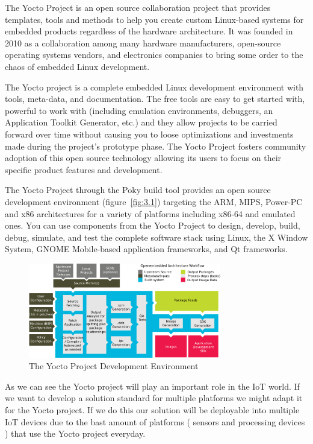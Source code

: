 The Yocto Project is an open source collaboration project that provides
templates, tools and methods to help you create custom Linux-based systems for
embedded products regardless of the hardware architecture\cite{yocto-project}.
It was founded in 2010 as a collaboration among many hardware manufacturers,
open-source operating systems vendors, and electronics companies to bring some
order to the chaos of embedded Linux development.\cite{Leppakoski}

The Yocto project  is a  complete embedded Linux development environment with
tools, meta-data, and documentation. The free tools are easy to get started
with, powerful to work with (including emulation environments, debuggers, an
Application Toolkit Generator, etc.) and they allow projects to be carried
forward over time without causing you to loose optimizations and investments
made during the project's prototype phase. The Yocto Project fosters community
adoption of this open source technology allowing its users to focus on their
specific product features and development.

The Yocto Project through the Poky build tool provides an open source
development environment (figure~\ref{fig:3.1})  targeting the ARM, MIPS,
Power-PC and x86 architectures for a variety of platforms including x86-64 and
emulated ones.  You can use components from the Yocto Project to design,
develop, build, debug, simulate, and test the complete software stack using
Linux, the X Window System, GNOME Mobile-based application frameworks, and Qt
frameworks. 

\begin{figure}[H]
\centering
\includegraphics[width=0.75\textwidth]{images/yocto-environment.png}
\caption{The Yocto Project Development Environment}
\label{fig:3.2}
\end{figure}

As we can see the Yocto project will play an important role in the IoT world.
If we want to develop a solution standard for multiple platforms we might adapt
it for the Yocto project. If we do this our solution will be deployable into
multiple IoT devices due to the bast amount of platforms ( sensors and
processing devices ) that use the Yocto project everyday.

